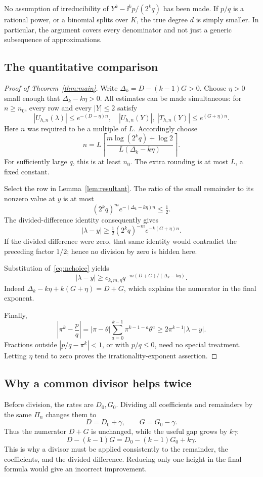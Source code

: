 No assumption of irreducibility of \(Y^k-\ii^kp/(2^kq)\)
has been made. If \(p/q\) is a rational power, or a binomial splits
over \(K\), the true degree \(d\) is simply smaller. In particular,
the argument covers every denominator and not just a generic
subsequence of approximations.

\subsection{The quantitative comparison}

\begin{proof}[Proof of Theorem~\ref{thm:main}]
Write \(\Delta_k=D-(k-1)G>0\). Choose \(\eta>0\) small enough that
\(\Delta_k-k\eta>0\). All estimates can be made simultaneous:
for \(n\ge n_0\), every row and every \(|Y|\le2\) satisfy
\[
|U_{h,n}(\lambda)|\le e^{-(D-\eta)n},\quad
|U_{h,n}(Y)|,\ |T_{h,n}(Y)|\le e^{(G+\eta)n}.
\]
Here \(n\) was required to be a multiple of \(L\). Accordingly choose
\begin{equation}\label{eq:nchoice}
n=L\left\lceil
\frac{m\log(2^kq)+\log2}
 {L(\Delta_k-k\eta)}
\right\rceil.
\end{equation}
For sufficiently large \(q\), this is at least \(n_0\).
The extra rounding is at most \(L\), a fixed constant.

Select the row in Lemma~\ref{lem:resultant}. The ratio of the small
remainder to its nonzero value at \(y\) is at most
\[
(2^kq)^m e^{-(\Delta_k-k\eta)n}\le\tfrac12.
\]
The divided-difference identity consequently gives
\[
|\lambda-y|
\ge\tfrac12(2^kq)^{-m}e^{-k(G+\eta)n}.
\]
If the divided difference were zero, that same identity would
contradict the preceding factor \(1/2\); hence no division by zero
is hidden here.

Substitution of~\eqref{eq:nchoice} yields
\[
|\lambda-y|\ge c_{k,m,\eta}
q^{-m(D+G)/(\Delta_k-k\eta)}.
\]
Indeed
\(\Delta_k-k\eta+k(G+\eta)=D+G\), which explains the numerator
in the final exponent.

Finally,
\[
\left|\pi^k-\frac pq\right|
=|\pi-\theta|\sum_{a=0}^{k-1}\pi^{k-1-a}\theta^a
\ge2\pi^{k-1}|\lambda-y|.
\]
Fractions outside \(|p/q-\pi^k|<1\), or with \(p/q\le0\),
need no special treatment. Letting \(\eta\) tend to zero proves
the irrationality-exponent assertion.
\end{proof}

\subsection{Why a common divisor helps twice}

Before division, the rates are \(D_0,G_0\). Dividing all coefficients
and remainders by the same \(\Pi_n\) changes them to
\[
D=D_0+\gamma,\qquad G=G_0-\gamma.
\]
Thus the numerator \(D+G\) is unchanged, while the useful gap grows by
\(k\gamma\):
\[
D-(k-1)G=D_0-(k-1)G_0+k\gamma.
\]
This is why a divisor must be applied consistently to the remainder,
the coefficients, and the divided difference. Reducing only one
height in the final formula would give an incorrect improvement.

